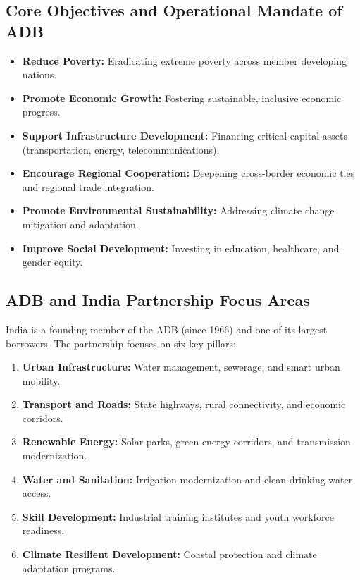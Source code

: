 \subsection{Core Objectives and Operational Mandate of ADB}
\begin{itemize}[leftmargin=*]
    \item \textbf{Reduce Poverty:} Eradicating extreme poverty across member developing nations.
    \item \textbf{Promote Economic Growth:} Fostering sustainable, inclusive economic progress.
    \item \textbf{Support Infrastructure Development:} Financing critical capital assets (transportation, energy, telecommunications).
    \item \textbf{Encourage Regional Cooperation:} Deepening cross-border economic ties and regional trade integration.
    \item \textbf{Promote Environmental Sustainability:} Addressing climate change mitigation and adaptation.
    \item \textbf{Improve Social Development:} Investing in education, healthcare, and gender equity.
\end{itemize}

\subsection{ADB and India Partnership Focus Areas}
India is a founding member of the ADB (since 1966) and one of its largest borrowers. The partnership focuses on six key pillars:
\begin{enumerate}[leftmargin=*]
    \item \textbf{Urban Infrastructure:} Water management, sewerage, and smart urban mobility.
    \item \textbf{Transport and Roads:} State highways, rural connectivity, and economic corridors.
    \item \textbf{Renewable Energy:} Solar parks, green energy corridors, and transmission modernization.
    \item \textbf{Water and Sanitation:} Irrigation modernization and clean drinking water access.
    \item \textbf{Skill Development:} Industrial training institutes and youth workforce readiness.
    \item \textbf{Climate Resilient Development:} Coastal protection and climate adaptation programs.
\end{enumerate}

